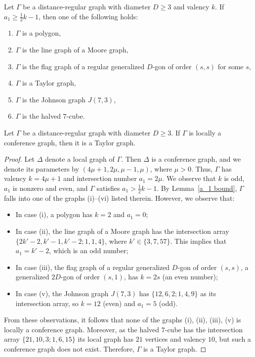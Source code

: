 \begin{lemma}[{\cite[Theorem 16]{KP2012}}]\label{a_1 bound}
Let $\Gamma$ be a distance-regular graph with diameter $D \geqslant 3$ and valency $k$. If $a_1 \geqslant \frac{1}{2}k -1$, then one of the following holds:
\begin{enumerate}[\normalfont(i)]
  \item $\Gamma$ is a polygon,
  \item $\Gamma$ is the line graph of a Moore graph,
  \item $\Gamma$ is the flag graph of a regular generalized $D$-gon of order $(s,s)$ for some $s$,
  \item $\Gamma$ is a Taylor graph,
  \item $\Gamma$ is the Johnson graph $J(7,3)$,
  \item $\Gamma$ is the halved $7$-cube.
\end{enumerate}
\end{lemma}



\begin{prop}\label{conference}
Let $\Gamma$ be a distance-regular graph with diameter $D \geqslant 3$. 
If $\Gamma$ is locally a conference graph, then it is a Taylor graph.
\end{prop}
\begin{proof}
Let $\Delta$ denote a local graph of $\Gamma$. 
Then $\Delta$ is a conference graph, and we denote its parameters by $(4\mu +1, 2\mu, \mu-1,\mu)$, where $\mu > 0$.
Thus, $\Gamma$ has valency $k=4\mu+1$ and intersection number $a_1=2\mu$.
We observe that $k$ is odd, $a_1$ is nonzero and even, and $\Gamma$ satisfies $a_1 > \frac{1}{2}k -1$.
By Lemma~\ref{a_1 bound}, $\Gamma$ falls into one of the graphs (i)--(vi) listed therein. 
However, we observe that:
\begin{itemize}\setlength\itemsep{0pt}
\item In case (i), a polygon has $k=2$ and $a_1=0$;
\item In case (ii), the line graph of a Moore graph has the intersection array $\{2k'-2,k'-1,k'-2;1,1,4\}$, where $k' \in \{3,7,57\}$.
This implies that $a_1 = k'-2$, which is an odd number;
\item In case (iii), the flag graph of a regular generalized $D$-gon of order $(s,s)$, a generalized $2D$-gon of order $(s,1)$, has $k= 2s$ (an even number);
\item In case (v), the Johnson graph $J(7,3)$ has $\{12,6,2;1,4,9\}$ as its intersection array, so $k=12$ (even) and $a_1=5$ (odd).
\end{itemize}
From these observations, it follows that none of the graphs (i), (ii), (iii), (v) is locally a conference graph.
Moreover, as the halved $7$-cube has the intersection array $\{21,10,3; 1,6,15\}$ its local graph has $21$ vertices and valency $10$, but such a conference graph does not exist.
Therefore, $\Gamma$ is a Taylor graph.
\end{proof}

